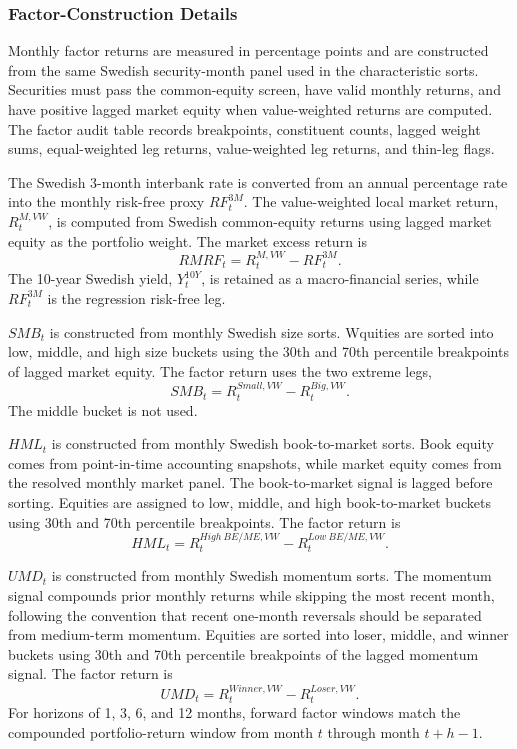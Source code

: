 \documentclass[11pt]{article}
\newcommand{\var}[1]{\ensuremath{#1}}
\begin{document}
\subsubsection{Factor-Construction Details}
\label{app:factor_construction_details}

Monthly factor returns are measured in percentage points and are constructed from the same Swedish security-month panel used in the characteristic sorts. Securities must pass the common-equity screen, have valid monthly returns, and have positive lagged market equity when value-weighted returns are computed. The factor audit table records breakpoints, constituent counts, lagged weight sums, equal-weighted leg returns, value-weighted leg returns, and thin-leg flags.

The Swedish 3-month interbank rate is converted from an annual percentage rate into the monthly risk-free proxy \var{RF^{3M}_t}. The value-weighted local market return, \var{R^{M,VW}_t}, is computed from Swedish common-equity returns using lagged market equity as the portfolio weight. The market excess return is
\begin{equation}
    RMRF_t = R^{M,VW}_t - RF^{3M}_t.
\end{equation}
The 10-year Swedish yield, \var{Y^{10Y}_t}, is retained as a macro-financial series, while \var{RF^{3M}_t} is the regression risk-free leg.

\var{SMB_t} is constructed from monthly Swedish size sorts. Wquities are sorted into low, middle, and high size buckets using the 30th and 70th percentile breakpoints of lagged market equity. The factor return uses the two extreme legs,
\begin{equation}
    SMB_t = R^{Small,VW}_t - R^{Big,VW}_t.
\end{equation}
The middle bucket is not used.

\var{HML_t} is constructed from monthly Swedish book-to-market sorts. Book equity comes from point-in-time accounting snapshots, while market equity comes from the resolved monthly market panel. The book-to-market signal is lagged before sorting. Equities are assigned to low, middle, and high book-to-market buckets using 30th and 70th percentile breakpoints. The factor return is
\begin{equation}
    HML_t = R^{High\ BE/ME,VW}_t - R^{Low\ BE/ME,VW}_t.
\end{equation}

\var{UMD_t} is constructed from monthly Swedish momentum sorts. The momentum signal compounds prior monthly returns while skipping the most recent month, following the convention that recent one-month reversals should be separated from medium-term momentum. Equities are sorted into loser, middle, and winner buckets using 30th and 70th percentile breakpoints of the lagged momentum signal. The factor return is
\begin{equation}
    UMD_t = R^{Winner,VW}_t - R^{Loser,VW}_t.
\end{equation}
For horizons of 1, 3, 6, and 12 months, forward factor windows match the compounded portfolio-return window from month \var{t} through month \var{t+h-1}.
\end{document}
